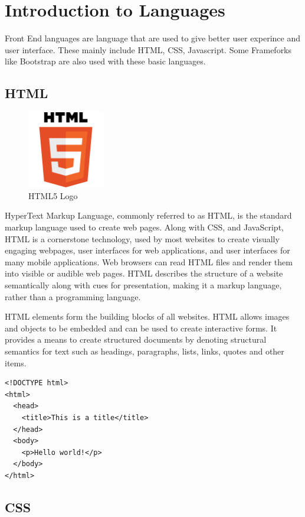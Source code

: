\section[Introduction to Languages]{Introduction to Languages}
Front End languages are language that are used to give better user experince and user interface. These mainly include HTML, CSS, Javascript. Some Frameforks like Bootstrap are also used with these basic languages.
\subsection{HTML}
\begin{figure}[!ht]
\centering
\includegraphics[width=0.3\textwidth]{input/images/HTML.png}                   
\caption{HTML5 Logo}
\hspace{-1.5em}
\end{figure}
HyperText Markup Language, commonly referred to as HTML, is the standard markup language used to create web pages. Along with CSS, and JavaScript, HTML is a cornerstone technology, used by most websites to create visually engaging webpages, user interfaces for web applications, and user interfaces for many mobile applications. Web browsers can read HTML files and render them into visible or audible web pages. HTML describes the structure of a website semantically along with cues for presentation, making it a markup language, rather than a programming language.


HTML elements form the building blocks of all websites. HTML allows images and objects to be embedded and can be used to create interactive forms. It provides a means to create structured documents by denoting structural semantics for text such as headings, paragraphs, lists, links, quotes and other items.

\begin{verbatim}
<!DOCTYPE html>
<html>
  <head>
    <title>This is a title</title>
  </head>
  <body>
    <p>Hello world!</p>
  </body>
</html>

\end{verbatim}


\subsection{CSS}

